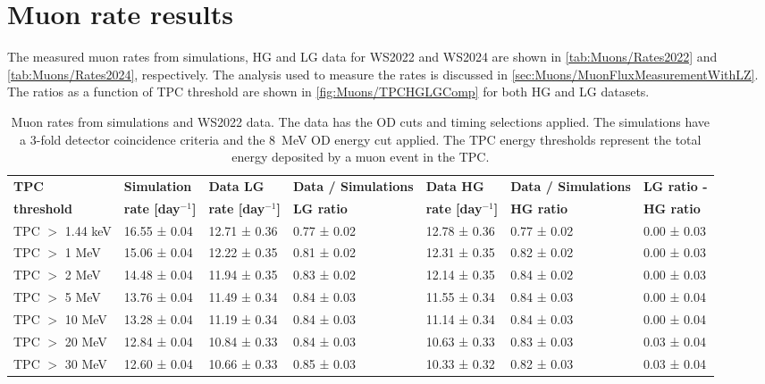 \section{Muon rate results}\label{sec:app/MuonRates}
The measured muon rates from simulations, HG and LG data for WS2022 and WS2024 are shown in \autoref{tab:Muons/Rates2022} and \autoref{tab:Muons/Rates2024}, respectively. The analysis used to measure the rates is discussed in \autoref{sec:Muons/MuonFluxMeasurementWithLZ}. The ratios as a function of TPC threshold are shown in \autoref{fig:Muons/TPCHGLGComp} for both HG and LG datasets.
\begin{landscape}
\begin{table}[ht!]
    \centering
    \caption[Muon rates from simulations and WS2022 data.]{Muon rates from simulations and WS2022 data. The data has the OD cuts and timing selections applied. The simulations have a 3-fold detector coincidence criteria and the 8~MeV OD energy cut applied. The TPC energy thresholds represent the total energy deposited by a muon event in the TPC.}
    \begin{tabular}{lllllll}
    \hline\hline
    \textbf{TPC} & \textbf{Simulation} & \textbf{Data LG} & \textbf{Data / Simulations} & \textbf{Data HG} & \textbf{Data / Simulations} & \textbf{LG ratio -} \\
    \textbf{threshold} & \textbf{rate [day$^{-1}$]} & \textbf{rate [day$^{-1}$]} & \textbf{LG ratio} & \textbf{rate [day$^{-1}$]} & \textbf{HG ratio} & \textbf{HG ratio} \\
    \hline
    TPC $>$ 1.44 keV &  16.55 ± 0.04 &  12.71 ± 0.36 & 0.77 ± 0.02  &  12.78 ± 0.36 & 0.77 ± 0.02  & 0.00 ± 0.03 \\ 
    TPC $>$ 1 MeV &  15.06 ± 0.04 &  12.22 ± 0.35 & 0.81 ± 0.02  &  12.31 ± 0.35 & 0.82 ± 0.02  & 0.00 ± 0.03 \\
    TPC $>$ 2 MeV &  14.48 ± 0.04 &  11.94 ± 0.35 & 0.83 ± 0.02  &  12.14 ± 0.35 & 0.84 ± 0.02  & 0.00 ± 0.03 \\
    TPC $>$ 5 MeV &  13.76 ± 0.04 &  11.49 ± 0.34 & 0.84 ± 0.03  &  11.55 ± 0.34 & 0.84 ± 0.03  & 0.00 ± 0.04 \\
    TPC $>$ 10 MeV &  13.28 ± 0.04 &  11.19 ± 0.34 & 0.84 ± 0.03 &  11.14 ± 0.34 & 0.84 ± 0.03  & 0.00 ± 0.04 \\
    TPC $>$ 20 MeV &  12.84 ± 0.04 &  10.84 ± 0.33 & 0.84 ± 0.03  &  10.63 ± 0.33 & 0.83 ± 0.03  & 0.03 ± 0.04 \\
    TPC $>$ 30 MeV &  12.60 ± 0.04 &  10.66 ± 0.33 & 0.85 ± 0.03  &  10.33 ± 0.32 & 0.82 ± 0.03  & 0.03 ± 0.04 \\

\end{tabular}
\end{table}
\end{landscape}
